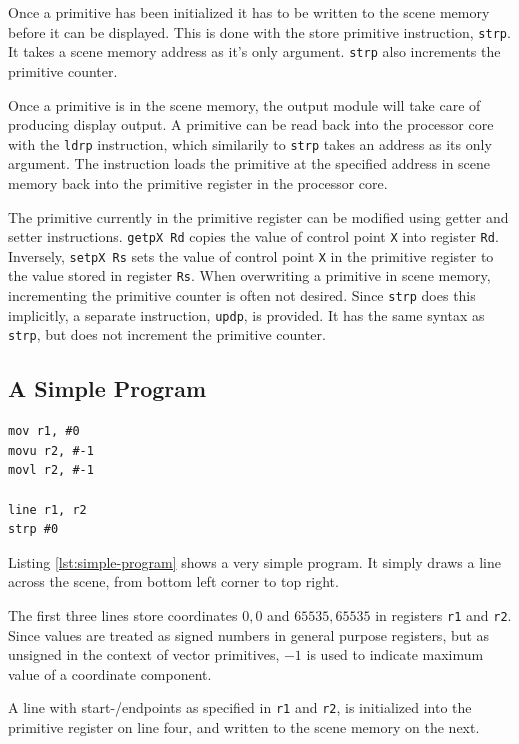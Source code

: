 Once a primitive has been initialized it has to be written to the scene memory before it can be displayed.
This is done with the store primitive instruction, \texttt{strp}.
It takes a scene memory address as it's only argument.
\texttt{strp} also increments the primitive counter.

Once a primitive is in the scene memory, the output module will take care of producing display output.
A primitive can be read back into the processor core with the \texttt{ldrp} instruction, which similarily to \texttt{strp} takes an address as its only argument.
The instruction loads the primitive at the specified address in scene memory back into the primitive register in the processor core.

The primitive currently in the primitive register can be modified using getter and setter instructions.
\texttt{getpX Rd} copies the value of control point \texttt{X} into register \texttt{Rd}.
Inversely, \texttt{setpX Rs} sets the value of control point \texttt{X} in the primitive register to the value stored in register \texttt{Rs}.
When overwriting a primitive in scene memory, incrementing the primitive counter is often not desired.
Since \texttt{strp} does this implicitly, a separate instruction, \texttt{updp}, is provided.
It has the same syntax as \texttt{strp}, but does not increment the primitive counter.

\subsection{A Simple \vthreek Program}

\begin{lstlisting}[label=lst:simple-program]
mov r1, #0
movu r2, #-1
movl r2, #-1

line r1, r2
strp #0
\end{lstlisting}

Listing \ref{lst:simple-program} shows a very simple \vthreek program.
It simply draws a line across the scene, from bottom left corner to top right.

The first three lines store coordinates $0, 0$ and $65535, 65535$ in registers \texttt{r1} and \texttt{r2}.
Since values are treated as signed numbers in general purpose registers, but as unsigned in the context of vector primitives, $-1$ is used to indicate maximum value of a coordinate component.

A line with start-/endpoints as specified in \texttt{r1} and \texttt{r2}, is initialized into the primitive register on line four, and written to the scene memory on the next.

